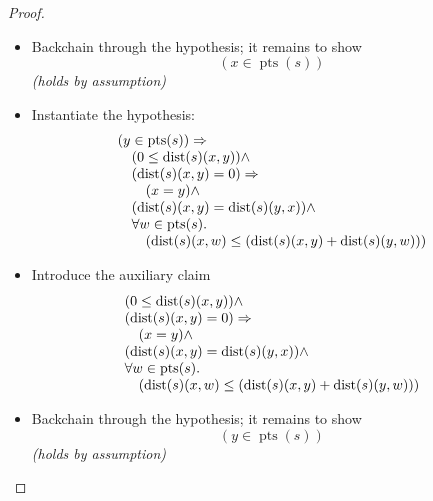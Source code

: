\begin{proof}
\begin{itemize}
  \item[\textbf{11--12}] Backchain through the hypothesis; it remains to show
\begin{equation*}
(x \in \operatorname{pts}(s))
\end{equation*}
  \emph{(holds by assumption)}
  \item[\textbf{13--14}] Instantiate the hypothesis:
\begin{equation*}
\begin{array}{@{}l@{}} (y \in \operatorname{pts}(s)) \Rightarrow  \\ \quad (0 \leq \operatorname{dist}(s)(x, y)) \wedge \\ \quad (\operatorname{dist}(s)(x, y) = 0) \Rightarrow  \\ \quad \quad (x = y) \wedge \\ \quad (\operatorname{dist}(s)(x, y) = \operatorname{dist}(s)(y, x)) \wedge \\ \quad \forall w \in \operatorname{pts}(s). \\ \quad \quad (\operatorname{dist}(s)(x, w) \leq (\operatorname{dist}(s)(x, y) + \operatorname{dist}(s)(y, w))) \end{array}
\end{equation*}

  \item[\textbf{15}] Introduce the auxiliary claim
\begin{equation*}
\begin{array}{@{}l@{}} (0 \leq \operatorname{dist}(s)(x, y)) \wedge \\ (\operatorname{dist}(s)(x, y) = 0) \Rightarrow  \\ \quad (x = y) \wedge \\ (\operatorname{dist}(s)(x, y) = \operatorname{dist}(s)(y, x)) \wedge \\ \forall w \in \operatorname{pts}(s). \\ \quad (\operatorname{dist}(s)(x, w) \leq (\operatorname{dist}(s)(x, y) + \operatorname{dist}(s)(y, w))) \end{array}
\end{equation*}

  \item[\textbf{16--21}] Backchain through the hypothesis; it remains to show
\begin{equation*}
(y \in \operatorname{pts}(s))
\end{equation*}
  \emph{(holds by assumption)}
\end{itemize}
\end{proof}
